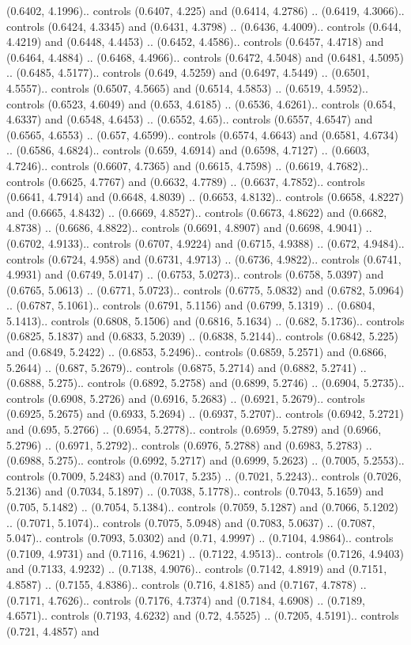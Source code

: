 (0.6402, 4.1996).. controls (0.6407, 4.225) and (0.6414, 4.2786) .. (0.6419, 4.3066).. controls (0.6424, 4.3345) and (0.6431, 4.3798) .. (0.6436, 4.4009).. controls (0.644, 4.4219) and (0.6448, 4.4453) .. (0.6452, 4.4586).. controls (0.6457, 4.4718) and (0.6464, 4.4884) .. (0.6468, 4.4966).. controls (0.6472, 4.5048) and (0.6481, 4.5095) .. (0.6485, 4.5177).. controls (0.649, 4.5259) and (0.6497, 4.5449) .. (0.6501, 4.5557).. controls (0.6507, 4.5665) and (0.6514, 4.5853) .. (0.6519, 4.5952).. controls (0.6523, 4.6049) and (0.653, 4.6185) .. (0.6536, 4.6261).. controls (0.654, 4.6337) and (0.6548, 4.6453) .. (0.6552, 4.65).. controls (0.6557, 4.6547) and (0.6565, 4.6553) .. (0.657, 4.6599).. controls (0.6574, 4.6643) and (0.6581, 4.6734) .. (0.6586, 4.6824).. controls (0.659, 4.6914) and (0.6598, 4.7127) .. (0.6603, 4.7246).. controls (0.6607, 4.7365) and (0.6615, 4.7598) .. (0.6619, 4.7682).. controls (0.6625, 4.7767) and (0.6632, 4.7789) .. (0.6637, 4.7852).. controls (0.6641, 4.7914) and (0.6648, 4.8039) .. (0.6653, 4.8132).. controls (0.6658, 4.8227) and (0.6665, 4.8432) .. (0.6669, 4.8527).. controls (0.6673, 4.8622) and (0.6682, 4.8738) .. (0.6686, 4.8822).. controls (0.6691, 4.8907) and (0.6698, 4.9041) .. (0.6702, 4.9133).. controls (0.6707, 4.9224) and (0.6715, 4.9388) .. (0.672, 4.9484).. controls (0.6724, 4.958) and (0.6731, 4.9713) .. (0.6736, 4.9822).. controls (0.6741, 4.9931) and (0.6749, 5.0147) .. (0.6753, 5.0273).. controls (0.6758, 5.0397) and (0.6765, 5.0613) .. (0.6771, 5.0723).. controls (0.6775, 5.0832) and (0.6782, 5.0964) .. (0.6787, 5.1061).. controls (0.6791, 5.1156) and (0.6799, 5.1319) .. (0.6804, 5.1413).. controls (0.6808, 5.1506) and (0.6816, 5.1634) .. (0.682, 5.1736).. controls (0.6825, 5.1837) and (0.6833, 5.2039) .. (0.6838, 5.2144).. controls (0.6842, 5.225) and (0.6849, 5.2422) .. (0.6853, 5.2496).. controls (0.6859, 5.2571) and (0.6866, 5.2644) .. (0.687, 5.2679).. controls (0.6875, 5.2714) and (0.6882, 5.2741) .. (0.6888, 5.275).. controls (0.6892, 5.2758) and (0.6899, 5.2746) .. (0.6904, 5.2735).. controls (0.6908, 5.2726) and (0.6916, 5.2683) .. (0.6921, 5.2679).. controls (0.6925, 5.2675) and (0.6933, 5.2694) .. (0.6937, 5.2707).. controls (0.6942, 5.2721) and (0.695, 5.2766) .. (0.6954, 5.2778).. controls (0.6959, 5.2789) and (0.6966, 5.2796) .. (0.6971, 5.2792).. controls (0.6976, 5.2788) and (0.6983, 5.2783) .. (0.6988, 5.275).. controls (0.6992, 5.2717) and (0.6999, 5.2623) .. (0.7005, 5.2553).. controls (0.7009, 5.2483) and (0.7017, 5.235) .. (0.7021, 5.2243).. controls (0.7026, 5.2136) and (0.7034, 5.1897) .. (0.7038, 5.1778).. controls (0.7043, 5.1659) and (0.705, 5.1482) .. (0.7054, 5.1384).. controls (0.7059, 5.1287) and (0.7066, 5.1202) .. (0.7071, 5.1074).. controls (0.7075, 5.0948) and (0.7083, 5.0637) .. (0.7087, 5.047).. controls (0.7093, 5.0302) and (0.71, 4.9997) .. (0.7104, 4.9864).. controls (0.7109, 4.9731) and (0.7116, 4.9621) .. (0.7122, 4.9513).. controls (0.7126, 4.9403) and (0.7133, 4.9232) .. (0.7138, 4.9076).. controls (0.7142, 4.8919) and (0.7151, 4.8587) .. (0.7155, 4.8386).. controls (0.716, 4.8185) and (0.7167, 4.7878) .. (0.7171, 4.7626).. controls (0.7176, 4.7374) and (0.7184, 4.6908) .. (0.7189, 4.6571).. controls (0.7193, 4.6232) and (0.72, 4.5525) .. (0.7205, 4.5191).. controls (0.721, 4.4857) and 